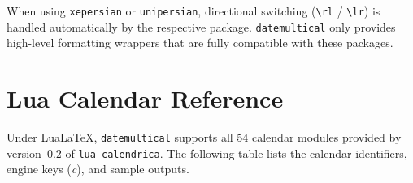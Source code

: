 \documentclass[10pt]{article}
\begin{document}
When using \texttt{xepersian} or \texttt{unipersian}, directional switching (\verb|\rl| / \verb|\lr|) is handled automatically by the respective package. \texttt{datemultical} only provides high-level formatting wrappers that are fully compatible with these packages.




\section{Lua Calendar Reference}
Under LuaLaTeX, \texttt{datemultical} supports all 54 calendar modules
provided by version~0.2 of \texttt{lua-calendrica}.
The following table lists the calendar identifiers, engine keys
(\textit{c}), and sample outputs.
\end{document}
